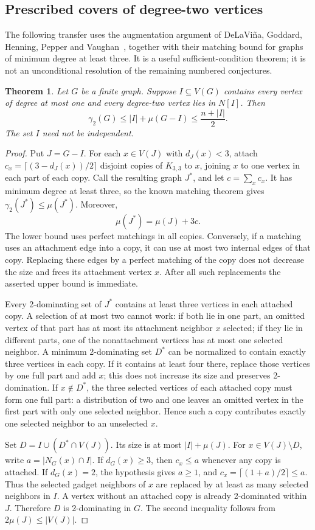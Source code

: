 \documentclass[11pt,a4paper]{article}
\newtheorem{theorem}{Theorem}[section]
\theoremstyle{remark}
\begin{document}
\subsection{Prescribed covers of degree-two vertices}
\label{r8:prescribed-cover}
The following transfer uses the augmentation argument of
DeLaVi\~na, Goddard, Henning, Pepper and Vaughan~\cite{DGHPV11},
together with their matching bound for graphs of minimum degree at least
three. It is a useful sufficient-condition theorem; it is not an
unconditional resolution of the remaining numbered conjectures.

\begin{theorem}\label{r8:cover-matching}
Let $G$ be a finite graph. Suppose $I\subseteq V(G)$ contains every
vertex of degree at most one and every degree-two vertex lies in $N[I]$.
Then
\[
 \gamma_2(G)\le |I|+\mu(G-I)\le\frac{n+|I|}{2}.
\]
The set $I$ need not be independent.
\end{theorem}
\begin{proof}
Put $J=G-I$. For each $x\in V(J)$ with $d_J(x)<3$, attach
$c_x=\lceil(3-d_J(x))/2\rceil$ disjoint copies of $K_{3,3}$ to $x$,
joining $x$ to one vertex in each part of each copy. Call the resulting
graph $J^*$, and let $c=\sum_xc_x$. It has minimum degree at least three,
so the known matching theorem gives $\gamma_2(J^*)\le\mu(J^*)$.
Moreover,
\[
 \mu(J^*)=\mu(J)+3c.
\]
The lower bound uses perfect matchings in all copies. Conversely, if a
matching uses an attachment edge into a copy, it can use at most two
internal edges of that copy. Replacing these edges by a perfect matching
of the copy does not decrease the size and frees its attachment vertex
$x$. After all such replacements the asserted upper bound is immediate.

Every 2-dominating set of $J^*$ contains at least three vertices in each
attached copy. A selection of at most two cannot work: if both lie in one
part, an omitted vertex of that part has at most its attachment neighbor
$x$ selected; if they lie in different parts, one of the nonattachment
vertices has at most one selected neighbor.
A minimum 2-dominating set $D^*$ can be normalized to contain exactly
three vertices in each copy. If it contains at least four there, replace
those vertices by one full part and add $x$; this does not increase its
size and preserves 2-domination. If $x\notin D^*$, the three selected
vertices of each attached copy must form one full part: a distribution
of two and one leaves an omitted vertex in the first part with only one
selected neighbor. Hence such a copy contributes exactly one selected
neighbor to an unselected $x$.

Set $D=I\cup(D^*\cap V(J))$. Its size is at most $|I|+\mu(J)$.
For $x\in V(J)\setminus D$, write $a=|N_G(x)\cap I|$.
If $d_G(x)\ge3$, then $c_x\le a$ whenever any copy is attached.
If $d_G(x)=2$, the hypothesis gives $a\ge1$, and
$c_x=\lceil(1+a)/2\rceil\le a$.
Thus the selected gadget neighbors of $x$ are replaced by at least as
many selected neighbors in $I$. A vertex without an attached copy is
already 2-dominated within $J$. Therefore $D$ is 2-dominating in $G$.
The second inequality follows from $2\mu(J)\le|V(J)|$.
\end{proof}
\end{document}
